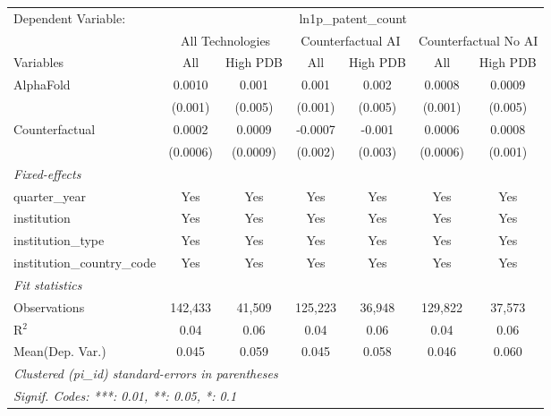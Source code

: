 \begingroup
\centering
\begin{tabular}{lcccccc}
   \tabularnewline \midrule \midrule
   Dependent Variable: & \multicolumn{6}{c}{ln1p\_patent\_count}\\
 & \multicolumn{2}{c}{All Technologies} & \multicolumn{2}{c}{Counterfactual AI} & \multicolumn{2}{c}{Counterfactual No AI} \\
\cmidrule(lr){1-1}\cmidrule(lr){2-3} \cmidrule(lr){4-5} \cmidrule(lr){6-7}
Variables & \multicolumn{1}{c}{All} & \multicolumn{1}{c}{High PDB} & \multicolumn{1}{c}{All} & \multicolumn{1}{c}{High PDB} & \multicolumn{1}{c}{All} & \multicolumn{1}{c}{High PDB} \\
\cmidrule(lr){1-1}\cmidrule(lr){2-2} \cmidrule(lr){3-3} \cmidrule(lr){4-4} \cmidrule(lr){5-5} \cmidrule(lr){6-6} \cmidrule(lr){7-7}
   AlphaFold                    & 0.0010   & 0.001    & 0.001   & 0.002   & 0.0008   & 0.0009\\   
                                & (0.001)  & (0.005)  & (0.001) & (0.005) & (0.001)  & (0.005)\\   
   Counterfactual               & 0.0002   & 0.0009   & -0.0007 & -0.001  & 0.0006   & 0.0008\\   
                                & (0.0006) & (0.0009) & (0.002) & (0.003) & (0.0006) & (0.001)\\   
   \midrule
   \emph{Fixed-effects}\\
   quarter\_year                & Yes      & Yes      & Yes     & Yes     & Yes      & Yes\\  
   institution                  & Yes      & Yes      & Yes     & Yes     & Yes      & Yes\\  
   institution\_type            & Yes      & Yes      & Yes     & Yes     & Yes      & Yes\\  
   institution\_country\_code   & Yes      & Yes      & Yes     & Yes     & Yes      & Yes\\  
   \midrule
   \emph{Fit statistics}\\
   Observations                 & 142,433  & 41,509   & 125,223 & 36,948  & 129,822  & 37,573\\  
   R$^2$                        & 0.04     & 0.06     & 0.04    & 0.06    & 0.04     & 0.06\\  
Mean(Dep. Var.) & 0.045 & 0.059 & 0.045 & 0.058 & 0.046 & 0.060 \\
   \midrule \midrule
   \multicolumn{7}{l}{\emph{Clustered (pi\_id) standard-errors in parentheses}}\\
   \multicolumn{7}{l}{\emph{Signif. Codes: ***: 0.01, **: 0.05, *: 0.1}}\\
\end{tabular}
\par\endgroup
